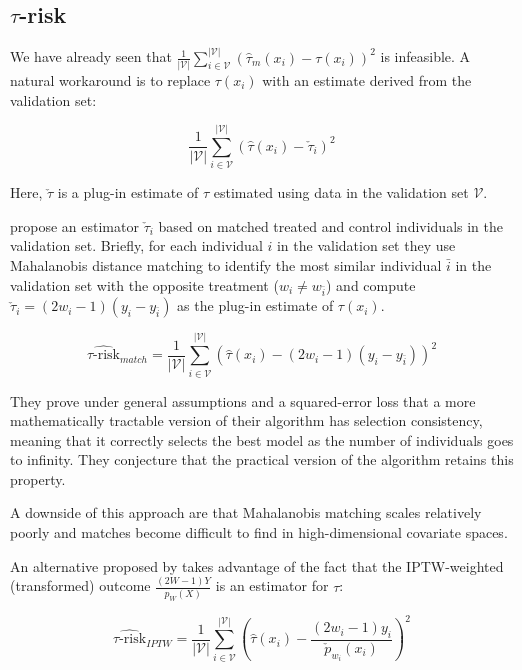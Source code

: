 \subsection{$\tau$-risk}

We have already seen that $\frac{1}{|\mathcal{V}|}\sum_{i \in \mathcal{V}}^{|\mathcal{V}|}  (\hat \tau_m (x_i)- \tau(x_i))^2$ is infeasible. A natural workaround is to replace $\tau(x_i)$ with an estimate derived from the validation set:

\[
\frac{1}{|\mathcal{V}|}\sum_{i \in \mathcal{V}}^{|\mathcal{V}|}  (\hat \tau (x_i) -  \check \tau_i)^2
\]

Here, $\check \tau$ is a plug-in estimate of $\tau$ estimated using data in the validation set $\mathcal{V}$. 

\citet{Rolling:2013kz} propose an estimator $\check \tau_i$ based on matched treated and control individuals in the validation set. Briefly, for each individual $i$ in the validation set they use Mahalanobis distance matching to identify the most similar individual $\bar{i}$ in the validation set with the opposite treatment ($w_i \ne w_{\bar i}$) and compute $\check \tau_i = (2w_i -1)(y_i - y_{\bar i})$ as the plug-in estimate of $\tau(x_i)$. 

\begin{equation}
\widehat{\tau\text{-risk}}_{match} = \frac{1}{|\mathcal{V}|}\sum_{i \in \mathcal{V}}^{|\mathcal{V}|}  (\hat \tau (x_i) - (2w_i -1)(y_i - y_{\bar i}))^2
\label{trisk-match}
\end{equation}

They prove under general assumptions and a squared-error loss that a more mathematically tractable version of their algorithm has selection consistency, meaning that it correctly selects the best model as the number of individuals goes to infinity. They conjecture that the practical version of the algorithm retains this property.

A downside of this approach are that Mahalanobis matching scales relatively poorly and matches become difficult to find in high-dimensional covariate spaces.

An alternative proposed by \citet{Gutierrez:2016tq} takes advantage of the fact that the IPTW-weighted (transformed) outcome $\frac{(2W-1)Y}{p_W(X)}$ is an estimator for $\tau$:

\begin{equation}
\widehat{\tau\text{-risk}}_{IPTW} = 
	\frac{1}{|\mathcal{V}|}\sum_{i \in \mathcal{V}}^{|\mathcal{V}|}  
	\left(\hat \tau (x_i) - \frac{(2w_i -1)y_i}{\check p_{w_i}(x_i)}\right)^2
\label{trisk-iptw}
\end{equation}

